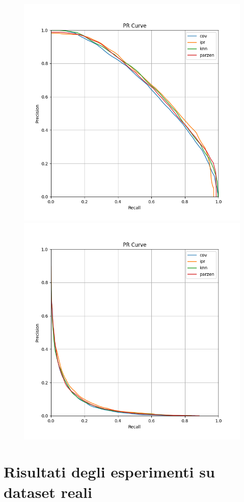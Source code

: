 \begin{figure}[h!]
    \includegraphics[width=\linewidth]{../images/toyexperiments/prcurves/PRCurve_nosplit_ksqrt_s1.png}
    \includegraphics[width=\linewidth]{../images/toyexperiments/prcurves/PRCurve_nosplit_ksqrt_s3.png}
\end{figure}

\section{Risultati degli esperimenti su dataset reali}